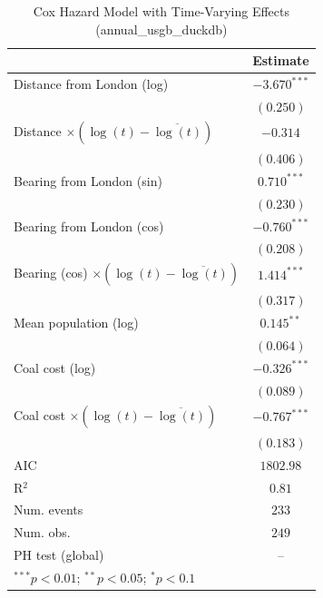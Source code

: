 
\begin{table}
\begin{center}
\begin{tabular}{l c}
\hline
 & Estimate \\
\hline
Distance from London (log) & $-3.670^{***}$ \\
 & $(0.250)$ \\
Distance $\times (\log(t)-\overline{\log(t)})$ & $-0.314$ \\
 & $(0.406)$ \\
Bearing from London (sin) & $0.710^{***}$ \\
 & $(0.230)$ \\
Bearing from London (cos) & $-0.760^{***}$ \\
 & $(0.208)$ \\
Bearing (cos) $\times (\log(t)-\overline{\log(t)})$ & $1.414^{***}$ \\
 & $(0.317)$ \\
Mean population (log) & $0.145^{**}$ \\
 & $(0.064)$ \\
Coal cost (log) & $-0.326^{***}$ \\
 & $(0.089)$ \\
Coal cost $\times (\log(t)-\overline{\log(t)})$ & $-0.767^{***}$ \\
 & $(0.183)$ \\
\hline
AIC              & $1802.98$ \\
R$^2$            & $0.81$ \\
Num. events      & $233$ \\
Num. obs.        & $249$ \\
PH test (global) & -- \\
\hline
\multicolumn{2}{l}{\scriptsize{$^{***}p<0.01$; $^{**}p<0.05$; $^{*}p<0.1$}}
\end{tabular}
\caption{Cox Hazard Model with Time-Varying Effects (annual\_usgb\_duckdb)}
\label{tab:cox_tv_annual_usgb_duckdb}
\end{center}
\end{table}
